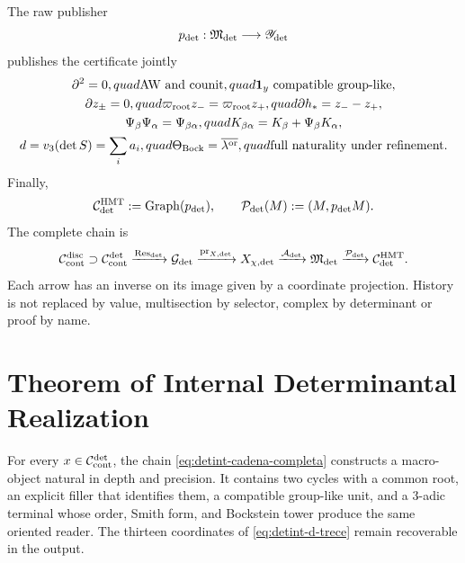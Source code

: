 The raw publisher
\begin{equation}\label{eq:detint-publicador-crudo}
 p_{\rm det}:\mathfrak M_{\rm det}\longrightarrow\mathscr Y_{\rm det}
\end{equation}
publishes the certificate jointly
\begin{equation}\label{eq:detint-certificado-publicado}
\begin{gathered}
 \partial^2=0,quad \text{AW and counit},quad
 \mathbf1_y\text{ compatible group-like},\\
 \partial z_\pm=0,quad
 \varpi_{\rm root}z_-=\varpi_{\rm root}z_+,quad
 \partial h_*=z_--z_+,\\
 \Psi_\beta\Psi_\alpha=\Psi_{\beta\alpha},quad
 K_{\beta\alpha}=K_\beta+\Psi_\beta K_\alpha,\\
 d=v_3(\det S)=\sum_i a_i,quad
 \Theta_{\rm Bock}=\overline{\lambda^{\rm or}},quad
 \text{full naturality under refinement}.
\end{gathered}
\end{equation}
Finally,
\begin{equation}\label{eq:detint-graph-p}
 \mathcal C_{\rm det}^{\rm HMT}:=\operatorname{Graph}(p_{\rm det}),
 \qquad
 \mathcal P_{\rm det}(M):=(M,p_{\rm det}M).
\end{equation}
The complete chain is
\begin{equation}\label{eq:detint-cadena-completa}
 \mathcal C_{\rm cont}^{\rm disc}\supset
 \mathcal C_{\rm cont}^{\rm det}
 \xrightarrow{\operatorname{Res}_{\rm det}}\mathcal G_{\rm det}
 \xrightarrow{\operatorname{pr}_{X,{\rm det}}}X_{\chi,{\rm det}}
 \xrightarrow{\mathcal A_{\rm det}}\mathfrak M_{\rm det}
 \xrightarrow{\mathcal P_{\rm det}}\mathcal C_{\rm det}^{\rm HMT}.
\end{equation}
Each arrow has an inverse on its image given by a coordinate
projection. History is not replaced by value, multisection by selector,
complex by determinant or proof by name.

\section{Theorem of Internal Determinantal Realization}

\begin{theorem}
\label{thm:detint-realizacion}
For every \(x\in\mathcal C_{\rm cont}^{\rm det}\), the chain
\eqref{eq:detint-cadena-completa} constructs a macro-object natural in
depth and precision. It contains two cycles with a common root, an explicit filler
that identifies them, a compatible group-like unit, and a
\(3\)-adic terminal whose order, Smith form, and Bockstein tower produce the same
oriented reader. The thirteen coordinates of \eqref{eq:detint-d-trece}
remain recoverable in the output.
\end{theorem}


